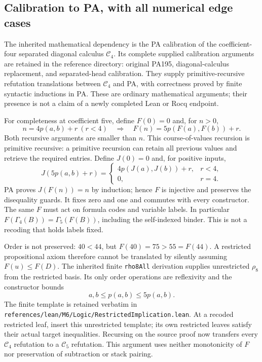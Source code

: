 \subsection{Calibration to PA, with all numerical edge cases}

The inherited mathematical dependency is the PA calibration of the
coefficient-four separated diagonal calculus $\mathcal C_4$. Its complete
supplied calibration arguments are retained in the reference directory:
original PA195, diagonal-calculus replacement, and separated-head
calibration. They supply primitive-recursive refutation translations
between $\mathcal C_4$ and PA, with correctness proved by finite syntactic
inductions in PA. These are ordinary mathematical arguments; their
presence is not a claim of a newly completed Lean or Rocq endpoint.

For completeness at coefficient five, define $F(0)=0$ and, for $n>0$,
\[
 n=4p(a,b)+r\ (r<4)\quad\Longrightarrow\quad
 F(n)=5p(F(a),F(b))+r.
\]
Both recursive arguments are smaller than $n$. This course-of-values
recursion is primitive recursive: a primitive recursion can retain all
previous values and retrieve the required entries. Define $J(0)=0$ and,
for positive inputs,
\[
 J(5p(a,b)+r)=
 \begin{cases}4p(J(a),J(b))+r,&r<4,\\0,&r=4.\end{cases}
\]
PA proves $J(F(n))=n$ by induction; hence $F$ is injective and preserves
the disequality guards. It fixes zero and one and commutes with every
constructor. The same $F$ must act on formula codes and variable labels.
In particular $F(\Gamma_4(B))=\Gamma_5(F(B))$, including the
self-indexed binder. This is not a recoding that holds labels fixed.

Order is not preserved: $40<44$, but $F(40)=75>55=F(44)$.
A restricted propositional axiom therefore cannot be translated by
silently assuming $F(u)\leq F(D)$. The inherited finite
\texttt{rho8All} derivation supplies unrestricted $\rho_8$ from the
restricted basis. Its only order operations are reflexivity and the
constructor bounds
\[
                        a,b\leq p(a,b)\leq5p(a,b).
\]
The finite template is retained verbatim in
\nolinkurl{references/lean/M6/Logic/RestrictedImplication.lean}.
At a recoded restricted leaf, insert this unrestricted template;
its own restricted leaves satisfy their actual target inequalities.
Recursing on the source proof now transfers every $\mathcal C_4$
refutation to a $\mathcal C_5$ refutation. This argument uses neither
monotonicity of $F$ nor preservation of subtraction or stack pairing.

